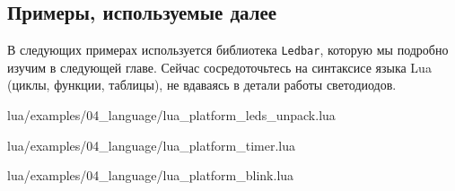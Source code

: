 \subsection{Примеры, используемые далее}
\begin{infobox}
    В следующих примерах используется библиотека \texttt{Ledbar}, которую мы подробно изучим в следующей главе. Сейчас сосредоточьтесь на синтаксисе языка Lua (циклы, функции, таблицы), не вдаваясь в детали работы светодиодов.
\end{infobox}
\begin{codefile}{lua/examples/04_language/lua_platform_leds_unpack.lua}
\end{codefile}
\begin{codefile}{lua/examples/04_language/lua_platform_timer.lua}
\end{codefile}
\begin{codefile}{lua/examples/04_language/lua_platform_blink.lua}
\end{codefile}

